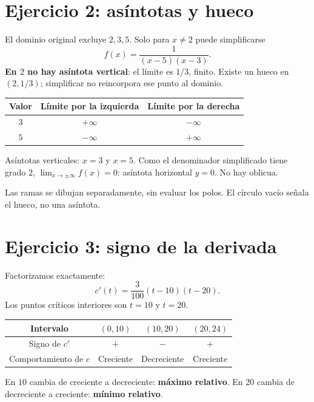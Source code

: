 \documentclass[11pt]{article}
\begin{document}
\section*{Ejercicio 2: asíntotas y hueco}
El dominio original excluye $2,3,5$. Solo para $x\neq2$ puede simplificarse
\[f(x)=\frac1{(x-5)(x-3)}.\]
\textbf{En $2$ no hay asíntota vertical}: el límite es $1/3$, finito. Existe un hueco en $(2,1/3)$; simplificar no reincorpora ese punto al dominio.
\begin{center}\begin{tabular}{c|cc}
Valor & Límite por la izquierda & Límite por la derecha\\\hline
$3$ & $+\infty$ & $-\infty$\\
$5$ & $-\infty$ & $+\infty$
\end{tabular}\end{center}
Asíntotas verticales: $x=3$ y $x=5$. Como el denominador simplificado tiene grado 2, $\lim_{x\to\pm\infty}f(x)=0$: asíntota horizontal $y=0$. No hay oblicua.
\begin{center}\end{center}
Las ramas se dibujan separadamente, sin evaluar los polos. El círculo vacío señala el hueco, no una asíntota.
\clearpage
\section*{Ejercicio 3: signo de la derivada}
Factorizamos exactamente:
\[c'(t)=\frac3{100}(t-10)(t-20).\]
Los puntos críticos interiores son $t=10$ y $t=20$.
\begin{center}\begin{tabular}{c|ccc}
Intervalo & $(0,10)$ & $(10,20)$ & $(20,24)$\\\hline
Signo de $c'$ & $+$ & $-$ & $+$\\
Comportamiento de $c$ & Creciente & Decreciente & Creciente
\end{tabular}\end{center}
En $10$ cambia de creciente a decreciente: \textbf{máximo relativo}. En $20$ cambia de decreciente a creciente: \textbf{mínimo relativo}.
\end{document}
